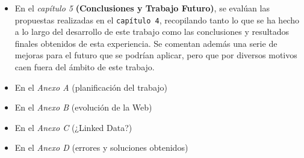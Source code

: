 \begin{itemize}

	\item En el \textit{capítulo 5} \textbf{(Conclusiones y Trabajo Futuro)}, se evalúan las propuestas realizadas en el \texttt{capítulo 4}, recopilando tanto lo que se ha hecho a lo largo del desarrollo de este trabajo como las conclusiones y resultados finales obtenidos de esta experiencia. Se comentan además una serie de mejoras para el futuro que se podrían aplicar, pero que por diversos motivos caen fuera del ámbito de este trabajo.
	
	\item En el \textit{Anexo A} (planificación del trabajo)
	
	\item En el \textit{Anexo B} (evolución de la Web)
	
	\item En el \textit{Anexo C} (¿Linked Data?)
		
	\item En el \textit{Anexo D} (errores y soluciones obtenidos)
			
	
\end{itemize}


